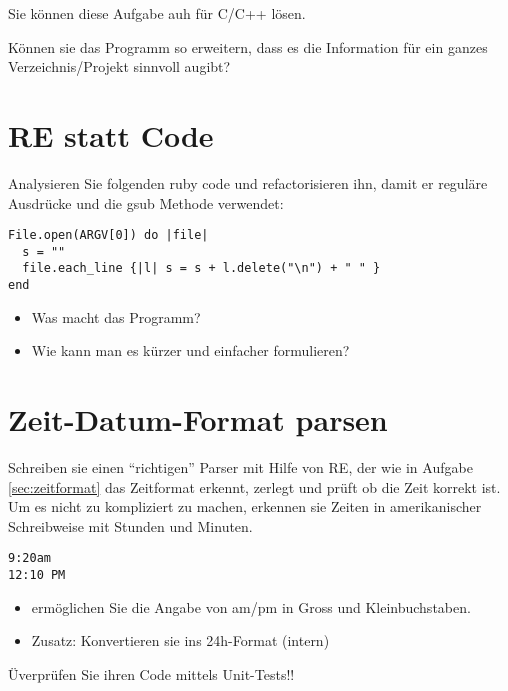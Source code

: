 \documentclass[a4paper,11pt,oneside]{scrbook}
\begin{document}
Sie können diese Aufgabe auh für C/C++ lösen.

Können sie das Programm so erweitern, dass es die Information für ein ganzes Verzeichnis/Projekt sinnvoll augibt?


\section{RE statt Code} %
\label{sec:re_statt_code}
Analysieren Sie folgenden ruby code und refactorisieren ihn, damit er reguläre Ausdrücke und die gsub Methode verwendet:

\begin{lstlisting}
File.open(ARGV[0]) do |file|
  s = ""
  file.each_line {|l| s = s + l.delete("\n") + " " } 
end
\end{lstlisting}

\begin{itemize}
	\item Was macht das Programm?
	\item Wie kann man es kürzer und einfacher formulieren?
\end{itemize}



\section{Zeit-Datum-Format parsen} %
\label{sec:zeit_datum_format_parsen}
Schreiben sie einen “richtigen” Parser mit Hilfe von RE, der wie in Aufgabe \ref{sec:zeitformat} das Zeitformat erkennt, zerlegt und prüft ob die Zeit korrekt ist. Um es nicht zu kompliziert zu machen, erkennen sie Zeiten in amerikanischer Schreibweise mit Stunden und Minuten.

\begin{lstlisting}
9:20am
12:10 PM
\end{lstlisting}

\begin{itemize}
	\item ermöglichen Sie die Angabe von am/pm in Gross und Kleinbuchstaben.
	\item Zusatz: Konvertieren sie ins 24h-Format (intern)
\end{itemize}

Üverprüfen Sie ihren Code mittels Unit-Tests!!
\end{document}
